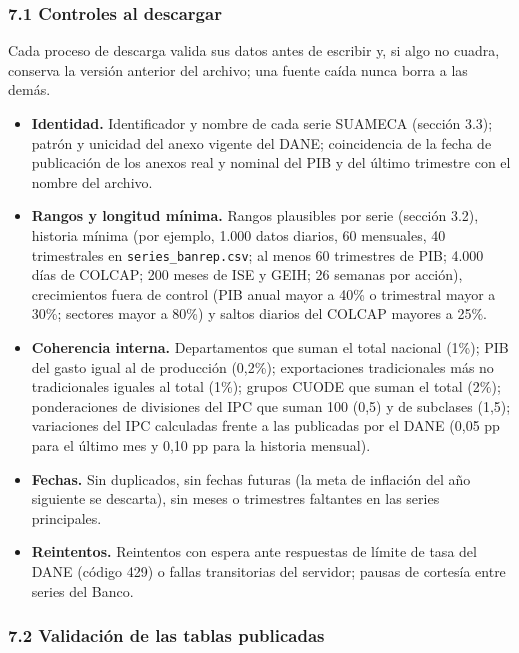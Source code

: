 \hypertarget{controles-al-descargar}{%
\subsubsection{7.1 Controles al
descargar}\label{controles-al-descargar}}

Cada proceso de descarga valida sus datos antes de escribir y, si algo
no cuadra, conserva la versión anterior del archivo; una fuente caída
nunca borra a las demás.

\begin{itemize}
\tightlist
\item
  \textbf{Identidad.} Identificador y nombre de cada serie SUAMECA
  (sección 3.3); patrón y unicidad del anexo vigente del DANE;
  coincidencia de la fecha de publicación de los anexos real y nominal
  del PIB y del último trimestre con el nombre del archivo.
\item
  \textbf{Rangos y longitud mínima.} Rangos plausibles por serie
  (sección 3.2), historia mínima (por ejemplo, 1.000 datos diarios, 60
  mensuales, 40 trimestrales en \texttt{series\_banrep.csv}; al menos 60
  trimestres de PIB; 4.000 días de COLCAP; 200 meses de ISE y GEIH; 26
  semanas por acción), crecimientos fuera de control (PIB anual mayor a
  40\% o trimestral mayor a 30\%; sectores mayor a 80\%) y saltos
  diarios del COLCAP mayores a 25\%.
\item
  \textbf{Coherencia interna.} Departamentos que suman el total nacional
  (1\%); PIB del gasto igual al de producción (0,2\%); exportaciones
  tradicionales más no tradicionales iguales al total (1\%); grupos
  CUODE que suman el total (2\%); ponderaciones de divisiones del IPC
  que suman 100 (0,5) y de subclases (1,5); variaciones del IPC
  calculadas frente a las publicadas por el DANE (0,05 pp para el último
  mes y 0,10 pp para la historia mensual).
\item
  \textbf{Fechas.} Sin duplicados, sin fechas futuras (la meta de
  inflación del año siguiente se descarta), sin meses o trimestres
  faltantes en las series principales.
\item
  \textbf{Reintentos.} Reintentos con espera ante respuestas de límite
  de tasa del DANE (código 429) o fallas transitorias del servidor;
  pausas de cortesía entre series del Banco.
\end{itemize}

\hypertarget{validaciuxf3n-de-las-tablas-publicadas}{%
\subsubsection{7.2 Validación de las tablas
publicadas}\label{validaciuxf3n-de-las-tablas-publicadas}}

